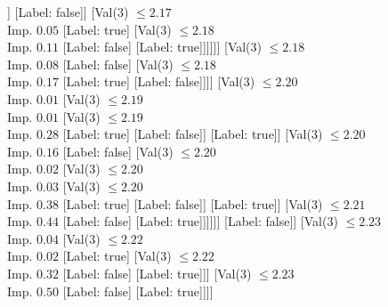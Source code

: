 \documentclass[margin=10pt]{standalone}
\begin{document}
\begin{forest}
																									[Val($3$) $ \leq 2.17$ \\ Imp. $0.50$
																										[Label: false]
																										[Label: true]]
																									[Label: false]]
																								[Val($3$) $ \leq 2.17$ \\ Imp. $0.05$
																									[Label: true]
																									[Val($3$) $ \leq 2.18$ \\ Imp. $0.11$
																										[Label: false]
																										[Label: true]]]]]]
																					[Val($3$) $ \leq 2.18$ \\ Imp. $0.08$
																						[Label: false]
																						[Val($3$) $ \leq 2.18$ \\ Imp. $0.17$
																							[Label: true]
																							[Label: false]]]]
																				[Val($3$) $ \leq 2.20$ \\ Imp. $0.01$
																					[Val($3$) $ \leq 2.19$ \\ Imp. $0.01$
																						[Val($3$) $ \leq 2.19$ \\ Imp. $0.28$
																							[Label: true]
																							[Label: false]]
																						[Label: true]]
																					[Val($3$) $ \leq 2.20$ \\ Imp. $0.16$
																						[Label: false]
																						[Val($3$) $ \leq 2.20$ \\ Imp. $0.02$
																							[Val($3$) $ \leq 2.20$ \\ Imp. $0.03$
																								[Val($3$) $ \leq 2.20$ \\ Imp. $0.38$
																									[Label: true]
																									[Label: false]]
																								[Label: true]]
																							[Val($3$) $ \leq 2.21$ \\ Imp. $0.44$
																								[Label: false]
																								[Label: true]]]]]]
																			[Label: false]]
																		[Val($3$) $ \leq 2.23$ \\ Imp. $0.04$
																			[Val($3$) $ \leq 2.22$ \\ Imp. $0.02$
																				[Label: true]
																				[Val($3$) $ \leq 2.22$ \\ Imp. $0.32$
																					[Label: false]
																					[Label: true]]]
																			[Val($3$) $ \leq 2.23$ \\ Imp. $0.50$
																				[Label: false]
																				[Label: true]]]]

\end{forest}
\end{document}
